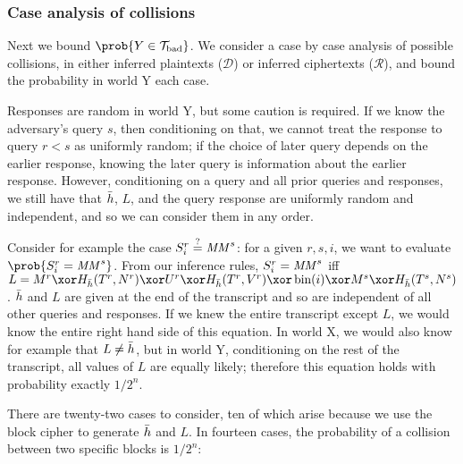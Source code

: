 \documentclass[hctr2.tex]{subfiles}
\begin{document}
\subsubsection{Case analysis of collisions}
Next we bound \(\prob{Y \in \Tb}\).
We consider a case by case analysis of possible collisions,
in either inferred plaintexts (\(\mathcal{D}\))
or inferred ciphertexts (\(\mathcal{R}\)),
and bound the probability in world Y each case.

Responses are random in world Y,
but some caution is required.
If we know the adversary's query \(s\), then conditioning on that,
we cannot treat the response to query \(r < s\) as uniformly random;
if the choice of later query depends on the earlier response,
knowing the later query is information about the earlier response.
However, conditioning on a query and all prior queries and responses,
we still have that \(\bar{h}\), \(L\), and the
query response are uniformly random and independent,
and so we can consider them in any order.

Consider for example the case \(S_i^r \stackrel{\text{?}}{=} \mathit{MM}^s\):
for a given \(r, s, i\),
we want to evaluate \(\prob{S_i^r = \MM^s}\).
From our inference rules, \(S_i^r = \mathit{MM}^s\)
iff \(L = M^r \xor H_{\hgen}(T^r, N^r) \xor U^r \xor H_{\hgen}(T^r, V^r)
\xor \fromint(i) \xor M^s \xor H_{\hgen}(T^s, N^s)\).
\(\bar{h}\) and \(L\) are given at the end of the transcript
and so are independent of all other queries and responses.
If we knew the entire transcript except \(L\),
we would know the entire right hand side of this equation.
In world X, we would also know for example that \(L \neq \bar{h}\), but
in world Y, conditioning on the rest of the transcript,
all values of \(L\) are equally likely;
therefore this equation holds with probability exactly \(1/2^n\).

There are twenty-two cases to consider,
ten of which arise because we use the block cipher
to generate \(\bar{h}\) and \(L\).
In fourteen cases, the probability of a collision
between two specific blocks is \(1/2^n\):
\end{document}
